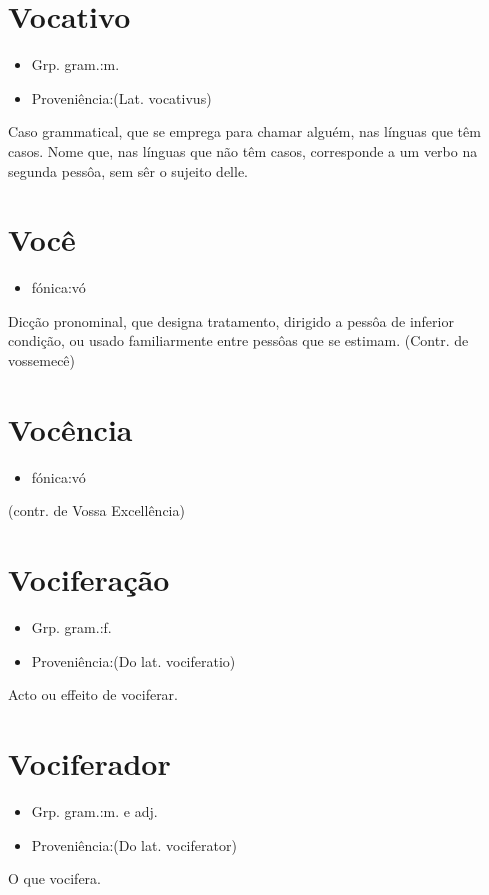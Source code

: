 \documentclass{article}
\begin{document}
\section{Vocativo}
\begin{itemize}
\item {Grp. gram.:m.}
\end{itemize}
\begin{itemize}
\item {Proveniência:(Lat. \textunderscore vocativus\textunderscore )}
\end{itemize}
Caso grammatical, que se emprega para chamar alguém, nas línguas que têm casos.
Nome que, nas línguas que não têm casos, corresponde a um verbo na segunda pessôa, sem sêr o sujeito delle.
\section{Você}
\begin{itemize}
\item {fónica:vó}
\end{itemize}
Dicção pronominal, que designa tratamento, dirigido a pessôa de inferior condição, ou usado familiarmente entre pessôas que se estimam.
(Contr. de \textunderscore vossemecê\textunderscore )
\section{Vocência}
\begin{itemize}
\item {fónica:vó}
\end{itemize}
(contr. de \textunderscore Vossa Excellência\textunderscore )
\section{Vociferação}
\begin{itemize}
\item {Grp. gram.:f.}
\end{itemize}
\begin{itemize}
\item {Proveniência:(Do lat. \textunderscore vociferatio\textunderscore )}
\end{itemize}
Acto ou effeito de vociferar.
\section{Vociferador}
\begin{itemize}
\item {Grp. gram.:m.  e  adj.}
\end{itemize}
\begin{itemize}
\item {Proveniência:(Do lat. \textunderscore vociferator\textunderscore )}
\end{itemize}
O que vocifera.
\end{document}
